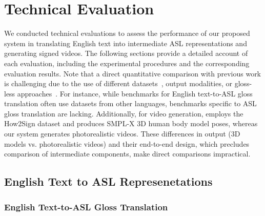 \section{Technical Evaluation}\label{sec:technical_eval}

We conducted technical evaluations to assess the performance of our proposed system in translating English text into intermediate ASL representations and generating signed videos. The following sections provide a detailed account of each evaluation, including the experimental procedures and the corresponding evaluation results. Note that a direct quantitative comparison with previous work is challenging due to the use of different datasets~\cite{inan2024generating,zhu_neural_2023,moryossef_data_2021}, output modalities, or gloss-less approaches~\cite{baltatzis2024neural}. For instance, while benchmarks for English text-to-ASL gloss translation often use datasets from other languages, benchmarks specific to ASL gloss translation are lacking. Additionally, for video generation, \cite{baltatzis2024neural} employs the How2Sign dataset and produces SMPL-X 3D human body model poses, whereas our system generates photorealistic videos. These differences in output (3D models vs. photorealistic videos) and their end-to-end design, which precludes comparison of intermediate components, make direct comparisons impractical.

\subsection{English Text to ASL Represenetations}\label{subsec:technical_eval_exp1} 

\subsubsection{English Text-to-ASL Gloss Translation}\label{subsubsec:english_to_gloss}

